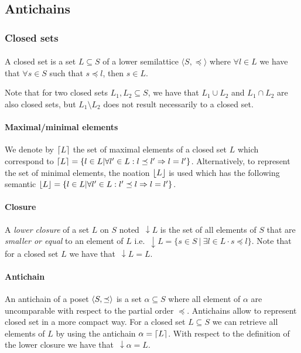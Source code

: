 \documentclass[letterpaper]{article}
\DeclarePairedDelimiter{\ceil}{\lceil}{\rceil}
\DeclarePairedDelimiter{\floor}{\lfloor}{\rfloor}
\DeclarePairedDelimiter{\tuple}{\langle}{\rangle}
\newcommand{\darrow}{\, \downarrow \!\!}
\begin{document}
\subsection{Antichains}

\subsubsection{Closed sets}

\paragraph{}


A closed set is a set $L \subseteq S$
of a lower semilattice $\langle S, \preceq \rangle$
where $\forall l \in L$ we have that $\forall s \in S$ such that
$s \preceq l$, then $s \in L$.

Note that for two closed sets $L_1, L_2 \subseteq S$, we have that
$L_1 \cup L_2$ and $L_1 \cap L_2$ are also closed sets,
but $L_1 \setminus L_2$ does not result necessarily to a closed set.

\paragraph{Maximal/minimal elements} We denote by $\ceil{L}$
the set of maximal elements of a closed set $L$ which
correspond to $\ceil{L} = \{ l \in L | \forall l' \in L :  l \preceq l'
 \Rightarrow l = l' \}$. Alternatively, to represent the set of minimal
 elements, the noation $\floor{L}$ is used which has the following semantic
$\floor{L} = \{ l \in L | \forall l' \in L :  l' \preceq l
 \Rightarrow l = l' \}$.


\paragraph{Closure} A \textit{lower closure} of a set $L$ on $S$
noted $\darrow L$ is the set of all elements of $S$ that are
\textit{smaller or equal} to an element of $L$ i.e.
$\darrow L = \{ s \in S \ | \ \exists l \in L \cdot s \preceq l\}$.
Note that for a closed set $L$ we have that $\darrow L = L$.



\paragraph{Antichain}

An antichain of a poset $\tuple{S, \preceq}$
is a set $\alpha \subseteq S$ where all element of $\alpha$
are uncomparable with respect to the partial order $\preceq$.
Antichains allow to represent closed set in a more compact way.
For a closed set $L \subseteq S$ we can retrieve all elements of $L$ by using
the antichain $\alpha = \ceil{L}$. With respect
to the definition of the lower closure we have that $\darrow \alpha = L$.
\end{document}
